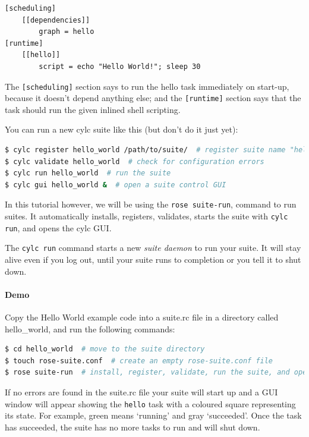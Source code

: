 \begin{lstlisting}[language=suiterc]
[scheduling]
    [[dependencies]]
        graph = hello
[runtime]
    [[hello]]
        script = echo "Hello World!"; sleep 30
\end{lstlisting}

The \lstinline{[scheduling]} section says to run the hello task immediately on
start-up, because it doesn't depend anything else; and the
\lstinline=[runtime]= section says that the task should run the given inlined
shell scripting.

You can run a new cylc suite like this (but don't do it just yet):

\begin{lstlisting}[language=bash]
$ cylc register hello_world /path/to/suite/  # register suite name "hello_world"
$ cylc validate hello_world  # check for configuration errors
$ cylc run hello_world  # run the suite
$ cylc gui hello_world &  # open a suite control GUI
\end{lstlisting}

In this tutorial however, we will be using the \lstinline{rose suite-run},
command to run suites.  It automatically installs, registers, validates, starts
the suite with \lstinline=cylc run=, and opens the cylc GUI.

The \lstinline{cylc run} command starts a new {\em suite daemon} to run your
suite.  It will stay alive even if you log out, until your suite runs to
completion or you tell it to shut down.


\paragraph*{Demo}
Copy the Hello World example code into a suite.rc file in a directory called
hello\_world, and run the following commands:

\begin{lstlisting}[language=bash]
$ cd hello_world  # move to the suite directory
$ touch rose-suite.conf  # create an empty rose-suite.conf file
$ rose suite-run  # install, register, validate, run the suite, and open the GUI
\end{lstlisting}

If no errors are found in the suite.rc file your suite will start up and a
GUI window will appear showing the \lstinline{hello} task with a coloured
square representing its state. For example, green means `running' and gray
`succeeded'.  Once the task has succeeded, the suite has no more tasks to run
and will shut down.

